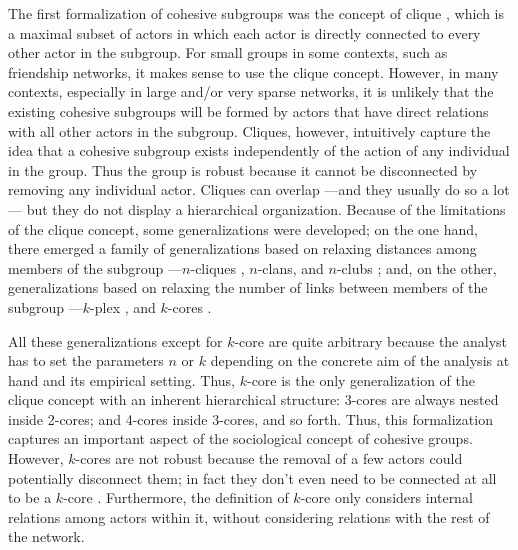 The first formalization of cohesive subgroups was the concept of clique \citep{luce:1949}, which is a maximal subset of actors in which each actor is directly connected to every other actor in the subgroup. For small groups in some contexts, such as friendship networks, it makes sense to use the clique concept. However, in many contexts, especially in large and/or very sparse networks, it is unlikely that the existing cohesive subgroups will be formed by actors that have direct relations with all other actors in the subgroup. Cliques, however, intuitively capture the idea that a cohesive subgroup exists independently of the action of any individual in the group. Thus the group is robust because it cannot be disconnected by removing any individual actor. Cliques can overlap ---and they usually do so a lot--- but they do not display a hierarchical organization. Because of the limitations of the clique concept, some generalizations were developed; on the one hand, there emerged a family of generalizations based on relaxing distances among members of the subgroup ---$n$-cliques , $n$-clans, and $n$-clubs \citep{mokken:1979}; and, on the other, generalizations based on relaxing the number of links between members of the subgroup ---$k$-plex \citep{seidman:1978}, and $k$-cores \citep{seidman:1983}.

All these generalizations except for $k$-core are quite arbitrary because the analyst has to set the parameters $n$ or $k$ depending on the concrete aim of the analysis at hand and its empirical setting. Thus, $k$-core is the only generalization of the clique concept with an inherent hierarchical structure: 3-cores are always nested inside 2-cores; and 4-cores inside 3-cores, and so forth. Thus, this formalization captures an important aspect of the sociological concept of cohesive groups. However, $k$-cores are not robust because the removal of a few actors could potentially disconnect them; in fact they don't even need to be connected at all to be a $k$-core \citep{white:2001}. Furthermore, the definition of $k$-core only considers internal relations among actors within it, without considering relations with the rest of the network.

